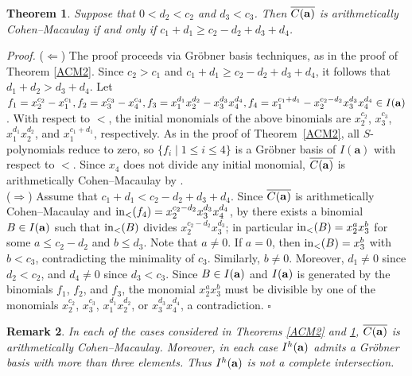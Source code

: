 \documentclass[10pt]{amsart}
\newtheorem{thm1}{Theorem}[section]
\newtheorem{rem1}[thm1]{Remark}
\begin{document}
\begin{thm1} \label{ACM3} Suppose that $0<d_2<c_2$ and $d_{3}<c_{3}$. Then $\overline{C({\bf a})}$ is arithmetically Cohen--Macaulay if and only if $c_{1}+d_{1} \geq c_{2}-d_{2}+d_{3}+d_{4}$.
\end{thm1}

{\em \noindent Proof.} ($\Leftarrow$) The proof proceeds via Gr\"obner basis techniques, as in the proof of Theorem \ref{ACM2}. Since $c_2 > c_1$ and $c_1 + d_1 \geq c_2 - d_2 + d_3 + d_4$, it follows that $d_1 + d_2 > d_3 + d_4$. Let $f_1=x_2^{c_2}-x_1^{c_1}, f_2=x_3^{c_3}-x_4^{c_4}, f_3=x_1^{d_1}x_2^{d_2}-x_3^{d_3}x_4^{d_4}, f_4=x_1^{c_1+d_{1}}-x_2^{c_{2}-d_2}x_3^{d_3}x_4^{d_4} \in I({\bf a})$. With respect to $<$, the initial monomials of the above binomials are $x_2^{c_2}$, $x_3^{c_3}$, $x_1^{d_1}x_2^{d_2}$, and $x_1^{c_1+d_{1}}$, respectively. As in the proof of Theorem~\ref{ACM2}, all $S$-polynomials reduce to zero, so $\{f_i \mid 1 \leq i \leq 4\}$ is a Gr\"obner basis of $I(\mathbf a)$ with respect to $<$. Since $x_4$ does not divide any initial monomial, $\overline{C({\bf a})}$ is arithmetically Cohen--Macaulay by \cite[Theorem 2.2]{HerSta}.\\
($\Rightarrow$) Assume that $c_{1}+d_{1}<c_{2}-d_{2}+d_{3}+d_{4}$. Since $\overline{C({\bf a})}$ is arithmetically Cohen--Macaulay and ${\rm in}_{<}(f_4)=x_2^{c_{2}-d_2}x_3^{d_3}x_4^{d_4}$, by \cite[Theorem 2.2]{HerSta} there exists a binomial $B \in I({\bf a})$ such that ${\rm in}_{<}(B)$ divides $x_2^{c_{2}-d_2}x_3^{d_3}$; in particular ${\rm in}_{<}(B)=x_2^{a}x_3^{b}$ for some $a \leq c_{2}-d_{2}$ and $b \leq d_{3}$. Note that $a \neq 0$. If $a = 0$, then ${\rm in}_{<}(B)= x_3^b$ with $b < c_3$, contradicting the minimality of $c_3$. Similarly, $b \neq 0$. Moreover, $d_1 \neq 0$ since $d_2 < c_2$, and $d_4 \neq 0$ since $d_3<c_3$. Since $B \in I({\bf a})$ and $I({\bf a})$ is generated by the binomials $f_1$, $f_2$, and $f_3$, the monomial $x_2^{a}x_3^{b}$ must be divisible by one of the monomials $x_2^{c_2}$, $x_3^{c_3}$, $x_1^{d_1}x_2^{d_2}$, or $x_3^{d_3}x_4^{d_4}$, a contradiction. \hfill $\square$

\begin{rem1} {\rm In each of the cases considered in Theorems \ref{ACM2} and \ref{ACM3}, $\overline{C({\bf a})}$ is arithmetically Cohen--Macaulay. Moreover, in each case $I^{h}({\bf a})$ admits a Gr\"obner basis with more than three elements. Thus $I^{h}({\bf a})$ is not a complete intersection.}
\end{rem1}
\end{document}
